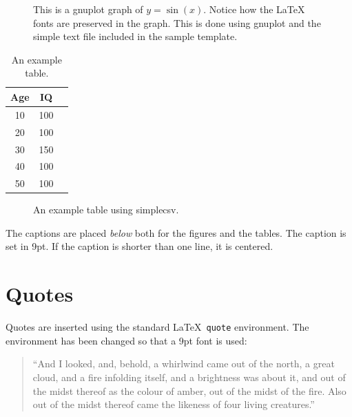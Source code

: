 \begin{figure}[tbp]  %
  \centering
  
  \caption[An example graph.]{This is a gnuplot graph of $y=\sin(x)$. Notice how the \LaTeX{} fonts are preserved in the graph. This is done using gnuplot and the simple text file included in the sample template.}
  \label{fig:examplegnuplot}
\end{figure}

\begin{table}[tbp]
  \centering
  \begin{tabular}{c|c|c}
    Age  & IQ  & \\ 
    \hline
    10   & 100 \\
    20   & 100 \\
    30   & 150 \\
    40   & 100 \\
    50   & 100
  \end{tabular}
  \caption{An example table.}
  \label{tab:example1}
\end{table}

\begin{figure}[tbp]
  \centering
  \caption{An example table using simplecsv.}
  \label{tab:examplecsv}
\end{figure}

The captions are placed \emph{below} both for the figures and the
tables. The caption is set in 9pt. If the caption is shorter than one
line, it is centered.

\section{Quotes}
\label{sec:Quotes} %

Quotes are inserted using the standard \LaTeX\ \texttt{quote}
environment. The environment has been changed so that a 9pt font is
used:

\begin{quote}
  ``And I looked, and, behold, a whirlwind came out of the north, a
  great cloud, and a fire infolding itself, and a brightness was about
  it, and out of the midst thereof as the colour of amber, out of the
  midst of the fire. Also out of the midst thereof came the likeness
  of four living creatures.''
\end{quote}

